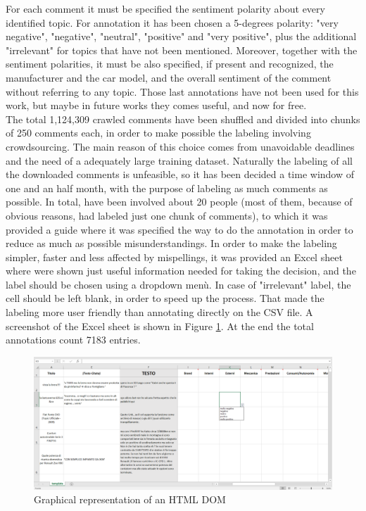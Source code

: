 For each comment it must be specified the sentiment polarity about every identified topic. For annotation it has been chosen a 5-degrees polarity: "very negative", "negative", "neutral", "positive" and "very positive", plus the additional "irrelevant" for topics that have not been mentioned. Moreover, together with the sentiment polarities, it must be also specified, if present and recognized, the manufacturer and the car model, and the overall sentiment of the comment without referring to any topic. Those last annotations have not been used for this work, but maybe in future works they comes useful, and now for free.\\
The total 1,124,309 crawled comments have been shuffled and divided into chunks of 250 comments each, in order to make possible the labeling involving crowdsourcing. The main reason of this choice comes from unavoidable deadlines and the need of a adequately large training dataset. Naturally the labeling of all the downloaded comments is unfeasible, so it has been decided a time window of one and an half month, with the purpose of labeling as much comments as possible. In total, have been involved about 20 people (most of them, because of obvious reasons, had labeled just one chunk of comments), to which it was provided a guide where it was specified the way to do the annotation in order to reduce as much as possible misunderstandings. In order to make the labeling simpler, faster and less affected by mispellings, it was provided an Excel sheet where were shown just useful information needed for taking the decision, and the label should be chosen using a dropdown menù. In case of "irrelevant" label, the cell should be left blank, in order to speed up the process. That made the labeling more user friendly than annotating directly on the CSV file. A screenshot of the Excel sheet is shown in Figure \ref{fig:excel-sheet}. At the end the total annotations count 7183 entries.\\


\begin{figure}[ht]
	\centering
	\includegraphics[width=1\textwidth]{figures/screen/excel-sheet.png}
	\caption{Graphical representation of an HTML DOM}
	\label{fig:excel-sheet}
\end{figure}


